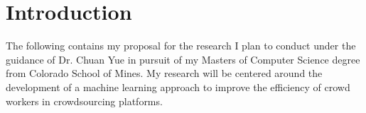 \documentclass[letterpaper,12pt]{article}
\begin{document}







\bodymatter



\chapter{Introduction}

The following contains my proposal for the research I plan to conduct under the guidance of Dr. Chuan Yue in pursuit of my Masters of Computer Science degree from Colorado School of Mines. My research will be centered around the development of a machine learning approach to improve the efficiency of crowd workers in crowdsourcing platforms.
\end{document}
